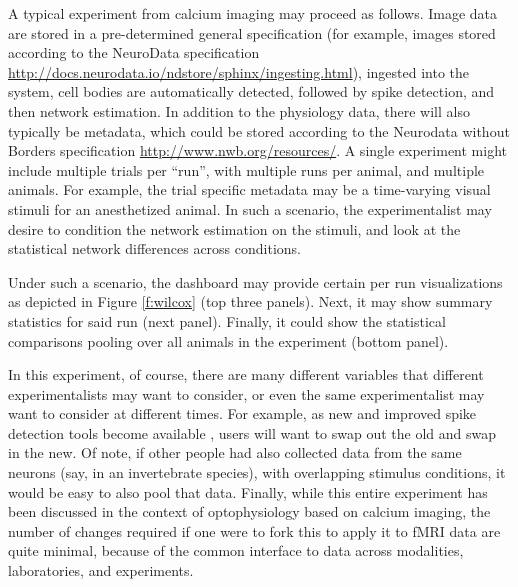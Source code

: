 A typical experiment from calcium imaging may proceed as follows.  Image data are stored in a pre-determined general specification (for example, images stored according to the NeuroData specification \url{http://docs.neurodata.io/ndstore/sphinx/ingesting.html}), ingested into the system, cell bodies are automatically detected, followed by spike detection, and then network estimation.  In addition to the physiology data, there will also typically be metadata, which could be stored according to the Neurodata without Borders specification \url{http://www.nwb.org/resources/}. A single experiment might include multiple trials per ``run'', with multiple runs per animal, and multiple animals.  For example, the trial specific metadata may be a time-varying visual stimuli for an anesthetized animal. In such a scenario, the experimentalist may desire to condition the network estimation on the stimuli, and look at the statistical network differences across conditions.

Under such a scenario, the dashboard may provide certain per run visualizations as depicted in Figure \ref{f:wilcox} (top three panels). Next, it may show summary statistics for said run (next panel).  Finally, it could show the statistical comparisons pooling over all animals in the experiment (bottom panel).

In this experiment, of course, there are many different variables that different experimentalists may want to consider, or even the same experimentalist may want to consider at different times.  For example, as new and improved spike detection tools become available \cite{Vogelstein2010b}, users will want to swap out the old and swap in the new.  Of note, if other people had also collected data from the same neurons (say, in an invertebrate species), with overlapping stimulus conditions, it would be easy to also pool that data. Finally, while this entire experiment has been discussed in the context of optophysiology based on calcium imaging, the number of changes required if one were to fork this to apply it to fMRI data are quite minimal, because of the common interface to data across modalities, laboratories, and experiments.


